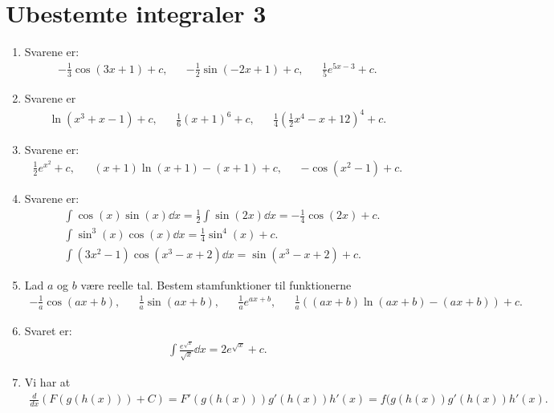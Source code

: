 \newpage
\section{Ubestemte integraler 3}

\begin{enumerate}
	\item Svarene er:
	\begin{align*}
	-\frac{1}{3}\cos(3x+1)+c,&& -\frac{1}{2} \sin(-2x+1)+c, && \frac{1}{5}e^{5x-3}+c.
	\end{align*}
	
	\item Svarene er
	\begin{align*}
	\ln(x^3+x-1)+c,&& \frac{1}{6}(x+1)^6+c,&& \frac{1}{4}(\frac{1}{2}x^4-x+12)^4+c.
	\end{align*}
	
		
	\item Svarene er:
	\begin{align*}
	\frac{1}{2}e^{x^2}+c, && (x+1)\ln(x+1)-(x+1)+c,&& -\cos(x^2-1)+c.
	\end{align*}
	

	
	\item Svarene er:
	\begin{align*}
	&\int \cos(x)\sin(x) \dd x=\frac{1}{2}\int \sin(2x)\dd x=-\frac{1}{4}\cos(2x)+c.\\
	&\int \sin^3(x)\cos(x) \dd x=\frac{1}{4}\sin^4(x)+c.\\	
	&\int (3x^2-1)\cos(x^3-x+2) \dd x= \sin(x^3-x+2)+c.
	\end{align*}
	
	\item Lad $a$ og $b$ være reelle tal. Bestem stamfunktioner til funktionerne
	\begin{align*}
	-\frac{1}{a} \cos(ax+b),&& \frac{1}{a}\sin(ax+b),&& \frac{1}{a}e^{ax+b},&&\frac{1}{a}((ax+b)\ln(ax+b)-(ax+b)) +c.
	\end{align*}
	
	\item Svaret er:
	\begin{align*}
	\int \frac{e^{\sqrt{x}}}{\sqrt{x}} \dd x=2e^{\sqrt{x}}+c.
	\end{align*}


	\item Vi har at 
	\begin{align*}
	\frac{d}{dx}(F(g(h(x))) +C)=F'(g(h(x)))g'(h(x))h'(x)=f(g(h(x))g'(h(x))h'(x).
	\end{align*}
	

\end{enumerate}
